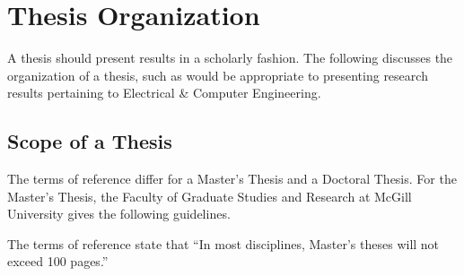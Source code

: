 \resetdatestamp

\chapter{Thesis Organization}

A thesis should present results in a scholarly fashion.
The following discusses the organization of a thesis, such as would be
 appropriate to presenting research results pertaining to Electrical \&
 Computer Engineering.

\section{Scope of a Thesis}

The terms of reference differ for a Master's Thesis and a Doctoral Thesis.
For the Master's Thesis, the Faculty of Graduate Studies and Research at
McGill University \cite{McGillTG:P1994} gives the following guidelines.

The terms of reference state that ``In most disciplines, Master's theses will
 not exceed 100 pages.''
